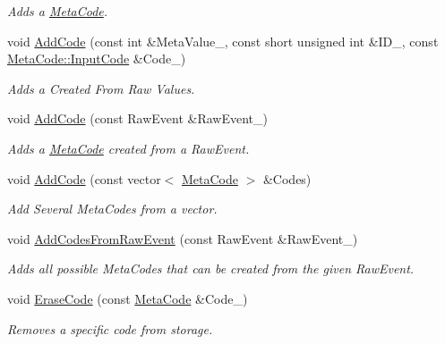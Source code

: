 \begin{DoxyCompactItemize}
\begin{DoxyCompactList}\small\item\em Adds a \hyperlink{classMetaCode}{MetaCode}. \item\end{DoxyCompactList}\item 
void \hyperlink{classPhysEventUserInput_ace3b98a502b8e784b58bc5dc599fc0c4}{AddCode} (const int \&MetaValue\_\-, const short unsigned int \&ID\_\-, const \hyperlink{classMetaCode_a7390e6f58e25c0ce377bba4e63081b24}{MetaCode::InputCode} \&Code\_\-)
\begin{DoxyCompactList}\small\item\em Adds a Created From Raw Values. \item\end{DoxyCompactList}\item 
void \hyperlink{classPhysEventUserInput_a385a4f7a6e88be43b6ba1ffc2a1bb5e3}{AddCode} (const RawEvent \&RawEvent\_\-)
\begin{DoxyCompactList}\small\item\em Adds a \hyperlink{classMetaCode}{MetaCode} created from a RawEvent. \item\end{DoxyCompactList}\item 
void \hyperlink{classPhysEventUserInput_aecac02073d3296c71e0ae4534daf8dce}{AddCode} (const vector$<$ \hyperlink{classMetaCode}{MetaCode} $>$ \&Codes)
\begin{DoxyCompactList}\small\item\em Add Several MetaCodes from a vector. \item\end{DoxyCompactList}\item 
void \hyperlink{classPhysEventUserInput_a9e42f42f9a4a42f792e5cf95856669c0}{AddCodesFromRawEvent} (const RawEvent \&RawEvent\_\-)
\begin{DoxyCompactList}\small\item\em Adds all possible MetaCodes that can be created from the given RawEvent. \item\end{DoxyCompactList}\item 
void \hyperlink{classPhysEventUserInput_a1dbd2996770df334fba9f67d9bb4ffa0}{EraseCode} (const \hyperlink{classMetaCode}{MetaCode} \&Code\_\-)
\begin{DoxyCompactList}\small\item\em Removes a specific code from storage. \item\end{DoxyCompactList}\item 

\end{DoxyCompactItemize}

